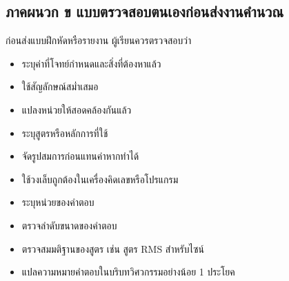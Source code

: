 

\subsection{ภาคผนวก ข แบบตรวจสอบตนเองก่อนส่งงานคำนวณ}

ก่อนส่งแบบฝึกหัดหรือรายงาน ผู้เรียนควรตรวจสอบว่า

\begin{itemize}
    \item [ ] ระบุค่าที่โจทย์กำหนดและสิ่งที่ต้องหาแล้ว
    \item [ ] ใช้สัญลักษณ์สม่ำเสมอ
    \item [ ] แปลงหน่วยให้สอดคล้องกันแล้ว
    \item [ ] ระบุสูตรหรือหลักการที่ใช้
    \item [ ] จัดรูปสมการก่อนแทนค่าหากทำได้
    \item [ ] ใช้วงเล็บถูกต้องในเครื่องคิดเลขหรือโปรแกรม
    \item [ ] ระบุหน่วยของคำตอบ
    \item [ ] ตรวจลำดับขนาดของคำตอบ
    \item [ ] ตรวจสมมติฐานของสูตร เช่น สูตร RMS สำหรับไซน์
    \item [ ] แปลความหมายคำตอบในบริบทวิศวกรรมอย่างน้อย 1 ประโยค
\end{itemize}
